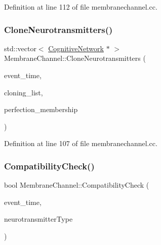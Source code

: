 Definition at line 112 of file membranechannel.\+cc.

\mbox{\label{class_membrane_channel_a6426185a0d73c967adcb72e3a22b48b0}} 
\subsubsection{\texorpdfstring{Clone\+Neurotransmitters()}{CloneNeurotransmitters()}}
{\footnotesize\ttfamily std\+::vector$<$ \mbox{\hyperlink{class_cognitive_network}{Cognitive\+Network}} $\ast$ $>$ Membrane\+Channel\+::\+Clone\+Neurotransmitters (\begin{DoxyParamCaption}\item[{std\+::chrono\+::time\+\_\+point$<$ \mbox{\hyperlink{universe_8h_a0ef8d951d1ca5ab3cfaf7ab4c7a6fd80}{Clock}} $>$}]{event\+\_\+time,  }\item[{std\+::vector$<$ \mbox{\hyperlink{class_cognitive_network}{Cognitive\+Network}} $\ast$$>$}]{cloning\+\_\+list,  }\item[{double}]{perfection\+\_\+membership }\end{DoxyParamCaption})}



Definition at line 107 of file membranechannel.\+cc.

\mbox{\label{class_membrane_channel_a67496ca67ad3ecae38f6b987547b1b99}} 
\subsubsection{\texorpdfstring{Compatibility\+Check()}{CompatibilityCheck()}}
{\footnotesize\ttfamily bool Membrane\+Channel\+::\+Compatibility\+Check (\begin{DoxyParamCaption}\item[{std\+::chrono\+::time\+\_\+point$<$ \mbox{\hyperlink{universe_8h_a0ef8d951d1ca5ab3cfaf7ab4c7a6fd80}{Clock}} $>$}]{event\+\_\+time,  }\item[{int}]{neurotransmitter\+Type }\end{DoxyParamCaption})}



